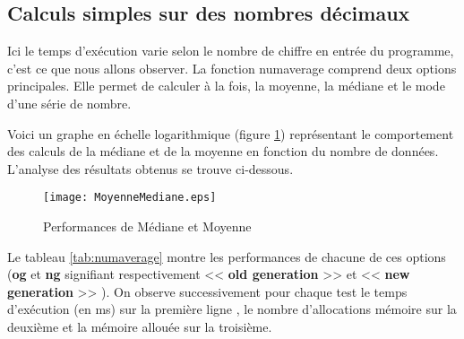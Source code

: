\subsection{Calculs simples sur des nombres d\'ecimaux}

Ici le temps d'ex\'ecution varie selon le nombre de chiffre en entr\'ee du programme, c'est ce que nous allons observer.
La fonction numaverage comprend deux options principales. Elle permet de calculer \`a la fois, la moyenne, la m\'ediane et le mode d'une s\'erie de nombre.
\newline

Voici un graphe en \'echelle logarithmique (figure \ref{tab:medmoy}) repr\'esentant le comportement des calculs de la m\'ediane et de la moyenne en fonction du nombre de 
donn\'ees. L'analyse des r\'esultats obtenus se trouve ci-dessous.

\begin{figure}[h]
\begin{center}
\texttt{[image: MoyenneMediane.eps]}
\end{center}
\caption{Performances de M\'ediane et Moyenne}
\label{tab:medmoy}
\end{figure}

Le tableau \ref{tab:numaverage} montre les performances de chacune de ces options (\textbf{og} et \textbf{ng} signifiant respectivement << \textbf{old generation} >> et << \textbf{new generation} >> ).
\newline
On observe successivement pour chaque test le temps d'ex\'ecution (en ms) sur la premi\`ere ligne , le nombre d'allocations m\'emoire sur la deuxi\`eme et la m\'emoire
allou\'ee sur la troisi\`eme.
\newline

